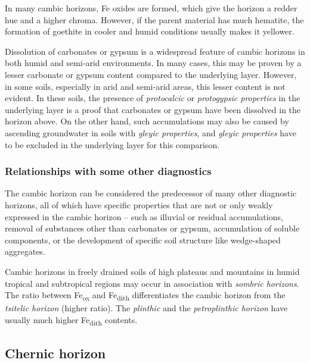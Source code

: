 \documentclass[
  letterpaper,
  DIV=11,
  numbers=noendperiod]{scrreprt}
\begin{document}
In many cambic horizons, Fe oxides are formed, which give the horizon a
redder hue and a higher chroma. However, if the parent material has much
hematite, the formation of goethite in cooler and humid conditions
usually makes it yellower.

Dissolution of carbonates or gypsum is a widespread feature of cambic
horizons in both humid and semi-arid environments. In many cases, this
may be proven by a lesser carbonate or gypsum content compared to the
underlying layer. However, in some soils, especially in arid and
semi-arid areas, this lesser content is not evident. In these soils, the
presence of \emph{protocalcic} or \emph{protogypsic properties} in the
underlying layer is a proof that carbonates or gypsum have been
dissolved in the horizon above. On the other hand, such accumulations
may also be caused by ascending groundwater in soils with \emph{gleyic
properties}, and \emph{gleyic properties} have to be excluded in the
underlying layer for this comparison.

\hypertarget{relationships-with-some-other-diagnostics-4}{%
\subsubsection{Relationships with some other
diagnostics}\label{relationships-with-some-other-diagnostics-4}}

The cambic horizon can be considered the predecessor of many other
diagnostic horizons, all of which have specific properties that are not
or only weakly expressed in the cambic horizon -- such as illuvial or
residual accumulations, removal of substances other than carbonates or
gypsum, accumulation of soluble components, or the development of
specific soil structure like wedge-shaped aggregates.

Cambic horizons in freely drained soils of high plateaus and mountains
in humid tropical and subtropical regions may occur in association with
\emph{sombric horizons}. The ratio between Fe\textsubscript{ox} and
Fe\textsubscript{dith} differentiates the cambic horizon from the
\emph{tsitelic horizon} (higher ratio). The \emph{plinthic} and the
\emph{petroplinthic horizon} have usually much higher
Fe\textsubscript{dith} contents.

\hypertarget{chernic-horizon}{%
\subsection{Chernic horizon}\label{chernic-horizon}}
\end{document}
